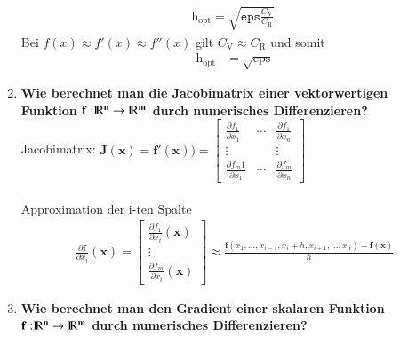 \begin{enumerate}
			\begin{align*}
				\text{h}_\text{opt}=\sqrt{\texttt{eps}\frac{C_\text{V}}{C_\text{R}}}.
			\end{align*}			 
			Bei $f(x)\approx f'(x) \approx f''(x)$ gilt $C_\text{V} \approx C_\text{R}$ und somit
			\begin{align*}
				\text{h}_\text{opt}&=\sqrt{\text{eps}}
			\end{align*}
		\item \textbf{Wie berechnet man die Jacobimatrix einer vektorwertigen Funktion $\mathbf{f:}{\rm I\!R}\mathbf{^n} \rightarrow {\rm I\!R}\mathbf{^m}$ durch numerisches Differenzieren?}\\
			Jacobimatrix: $\mathbf{J(x)}=\mathbf{f'(x)})=\begin{bmatrix}
				\frac{\partial f_1}{\partial x_1} & \cdots & \frac{\partial f_1}{\partial x_n} \\
				\vdots &  & \vdots \\
				\frac{\partial f_m1}{\partial x_1} & \cdots & \frac{\partial f_m}{\partial x_n}
			\end{bmatrix}$ \\\\
			Approximation der i-ten Spalte
			\begin{align*}
				\frac{\partial \mathbf{f}}{\partial x_i}(\mathbf{x})=
					\begin{bmatrix}
						\frac{\partial f_1}{\partial x_i}(\mathbf{x}) \\
						\vdots \\
						\frac{\partial f_m}{\partial x_i}(\mathbf{x})
					\end{bmatrix}
					\approx \frac{\mathbf{f}(x_1,\dots,x_{i-1},x_i+h,x_{i+1},\dots,x_n)-\mathbf{f(x)}}{h}
			\end{align*}
		\item \textbf{Wie berechnet man den Gradient einer skalaren Funktion $\mathbf{f:}{\rm I\!R}\mathbf{^n} \rightarrow {\rm I\!R}\mathbf{^m}$ durch numerisches Differenzieren?}\\
	\end{enumerate}